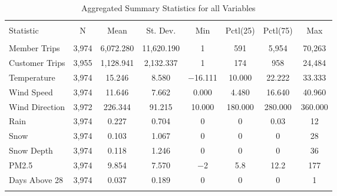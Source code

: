 \documentclass[12pt,letter paper]{article}
\begin{document}
\begin{table}[!htbp] \centering 
  \label{} 
\begin{tabular}{@{\extracolsep{5pt}}lccccccc} 
\\[-1.8ex]\hline 
\hline \\[-1.8ex] 
Statistic & \multicolumn{1}{c}{N} & \multicolumn{1}{c}{Mean} & \multicolumn{1}{c}{St. Dev.} & \multicolumn{1}{c}{Min} & \multicolumn{1}{c}{Pctl(25)} & \multicolumn{1}{c}{Pctl(75)} & \multicolumn{1}{c}{Max} \\ 
\hline \\[-1.8ex] 
Member Trips & 3,974 & 6,072.280 & 11,620.190 & 1 & 591 & 5,954 & 70,263 \\ 
Customer Trips & 3,955 & 1,128.941 & 2,132.337 & 1 & 174 & 958 & 24,484 \\ 
Temperature & 3,974 & 15.246 & 8.580 & $-$16.111 & 10.000 & 22.222 & 33.333 \\ 
Wind Speed & 3,974 & 11.646 & 7.662 & 0.000 & 4.480 & 16.640 & 40.960 \\ 
Wind Direction & 3,972 & 226.344 & 91.215 & 10.000 & 180.000 & 280.000 & 360.000 \\ 
Rain & 3,974 & 0.227 & 0.704 & 0 & 0 & 0.03 & 12 \\ 
Snow & 3,974 & 0.103 & 1.067 & 0 & 0 & 0 & 28 \\ 
Snow Depth & 3,974 & 0.118 & 1.246 & 0 & 0 & 0 & 36 \\ 
PM2.5 & 3,974 & 9.854 & 7.570 & $-$2 & 5.8 & 12.2 & 177 \\ 
Days Above 28 & 3,974 & 0.037 & 0.189 & 0 & 0 & 0 & 1 \\ 
\hline \\[-1.8ex] 
\end{tabular} 
  \caption{Aggregated Summary Statistics for all Variables}
\end{table}

\pagebreak
\end{document}
